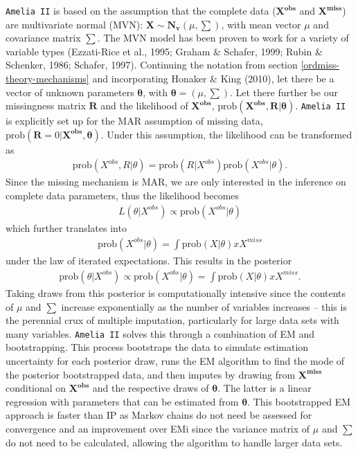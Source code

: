 \documentclass[12pt,econ]{sources/authesis}
\begin{document}
\texttt{Amelia\ II} is based on the assumption that the complete data (\(\bm{X^{obs}}\) and \(\bm{X^{miss}}\)) are multivariate normal (MVN): \(\bm{X} \sim \bm{N_v}(\mu, \sum)\), with mean vector \(\mu\) and covariance matrix \(\sum\). The MVN model has been proven to work for a variety of variable types (Ezzati-Rice et al., 1995; Graham \& Schafer, 1999; Rubin \& Schenker, 1986; Schafer, 1997). Continuing the notation from section \ref{ordmiss-theory-mechanisms} and incorporating Honaker \& King (2010), let there be a vector of unknown parameters \(\bm{\theta}\), with \(\bm{\theta} = (\mu, \sum)\). Let there further be our missingness matrix \(\bm{R}\) and the likelihood of \(\bm{X^{obs}}\), \(\text{prob}(\bm{X^{obs}}, \bm{R} | \bm{\theta})\). \texttt{Amelia\ II} is explicitly set up for the MAR assumption of missing data, \(\text{prob}(\bm{R} = 0 | \bm{X^{obs}}, \bm{\theta})\). Under this assumption, the likelihood can be transformed as
\begin{align}
\text{prob}(X^{obs}, R | \theta) = \text{prob}(R | X^{obs}) \text{prob}(X^{obs} | \theta).
\end{align}
Since the missing mechanism is MAR, we are only interested in the inference on complete data parameters, thus the likelihood becomes
\begin{align}
L(\theta | X^{obs}) \propto \text{prob}(X^{obs} | \theta)
\end{align}
which further translates into
\begin{align}
\text{prob}(X^{obs} | \theta) = \int \text{prob}(X | \theta) x X^{miss}
\end{align}
under the law of iterated expectations. This results in the posterior
\begin{align}
\text{prob}(\theta | X^{obs}) \propto \text{prob}(X^{obs} | \theta) = \int \text{prob}(X | \theta) x X^{miss}.
\end{align}
Taking draws from this posterior is computationally intensive since the contents of \(\mu\) and \(\sum\) increase exponentially as the number of variables increases -- this is the perennial crux of multiple imputation, particularly for large data sets with many variables. \texttt{Amelia\ II} solves this through a combination of EM and bootstrapping. This process bootstraps the data to simulate estimation uncertainty for each posterior draw, runs the EM algorithm to find the mode of the posterior bootstrapped data, and then imputes by drawing from \(\bm{X^{miss}}\) conditional on \(\bm{X^{obs}}\) and the respective draws of \(\bm{\theta}\). The latter is a linear regression with parameters that can be estimated from \(\bm{\theta}\). This bootstrapped EM approach is faster than IP as Markov chains do not need be assessed for convergence and an improvement over EMi since the variance matrix of \(\mu\) and \(\sum\) do not need to be calculated, allowing the algorithm to handle larger data sets.
\end{document}
